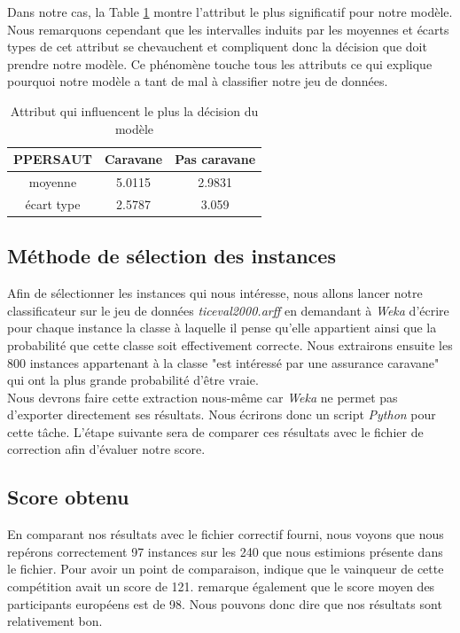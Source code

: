 \documentclass[10pt,a4paper]{article}
\begin{document}
				Dans notre cas, la Table \ref{tab:cap_desc} montre l'attribut le plus significatif pour notre modèle.	Nous remarquons cependant que les intervalles induits par les moyennes et écarts types de cet attribut se chevauchent et compliquent donc la décision que doit prendre notre modèle. Ce phénomène touche tous les attributs ce qui explique pourquoi notre modèle a tant de mal à classifier notre jeu de données. 

								
				\begin{table}[h]
					\centering
					\caption{Attribut qui influencent le plus la décision du modèle}
					\label{tab:cap_desc}
					\begin{tabular}{c|c c}
						PPERSAUT & Caravane & Pas caravane \\
						\hline
						moyenne & 5.0115 & 2.9831 \\
						écart type & 2.5787 & 3.059\\
					\end{tabular}
				\end{table}
				
			\subsection{Méthode de sélection des instances}
			
				Afin de sélectionner les instances qui nous intéresse, nous allons lancer notre classificateur sur le jeu de données \textit{ticeval2000.arff} en demandant à \textit{Weka} d'écrire pour chaque instance la classe à laquelle il pense qu'elle appartient ainsi que la probabilité que cette classe soit effectivement correcte. Nous extrairons ensuite les 800 instances appartenant à la classe "est intéressé par une assurance caravane" qui ont la plus grande probabilité d'être vraie.\\
				
				Nous devrons faire cette extraction nous-même car \textit{Weka} ne permet pas d'exporter directement ses résultats. Nous écrirons donc un script \textit{Python} pour cette tâche. L'étape suivante sera de comparer ces résultats avec le fichier de correction afin d'évaluer notre score.
				
			\subsection{Score obtenu}
			
				En comparant nos résultats avec le fichier correctif fourni, nous voyons que nous repérons correctement 97 instances sur les 240 que nous estimions présente dans le fichier. Pour avoir un point de comparaison, \cite[Putten]{CoIlChallenge} indique que le vainqueur de cette compétition avait un score de 121. \cite[Putten]{CoIlChallenge} remarque également que le score moyen des participants européens est de 98. Nous pouvons donc dire que nos résultats sont relativement bon.
				
\end{document}
